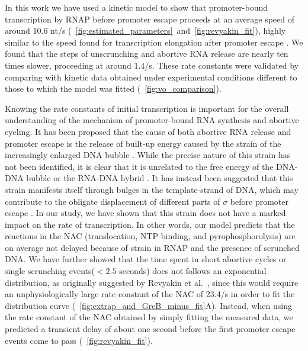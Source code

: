 %
In this work we have used a kinetic model to show that promoter-bound
transcription by RNAP before promoter escape proceeds at an average speed of
around 10.6 nt/s
(\FIGS~\ref{fig:estimated_parameters}~and~\ref{fig:revyakin_fit}), highly
similar to the speed found for transcription elongation after promoter escape
\cite{revyakin_abortive_2006}. We found that the steps of unscrunching and
abortive RNA release are nearly ten times slower, proceeding at around 1.4/s.
These rate constants were validated by comparing with kinetic data obtained
under experimental conditions different to those to which the model was fitted
(\FIG~\ref{fig:vo_comparison}).

Knowing the rate constants of initial transcription is important for the
overall understanding of the mechanism of promoter-bound RNA synthesis and
abortive cycling. It has been proposed that the cause of both abortive RNA
release and promoter escape is the release of built-up energy caused by the
strain of the increasingly enlarged DNA bubble \cite{straney_stressed_1987,
hsu_promoter_2002, revyakin_abortive_2006}. While the precise nature of this
strain has not been identified, it is clear that it is unrelated to the free
energy of the DNA-DNA bubble or the RNA-DNA hybrid \cite{hsu_initial_2006,
skancke_sequence-dependent_2015}. It has instead been suggested that this
strain manifests itself through bulges in the template-strand of DNA, which
may contribute to the obligate displacement of different parts of $\sigma$
before promoter escape \cite{winkelman_crosslink_2015}. In our study, we have
shown that this strain does not have a marked impact on the rate of
transcription. In other words, our model predicts that the reactions in the
NAC (translocation, NTP binding, and pyrophosphorolysis) are on average not
delayed because of strain in RNAP and the presence of scrunched DNA. We have
further showed that the time spent in short abortive cycles or single
scrunching events($< 2.5$ seconds) does not follows an exponential
distribution, as originally suggested by Revyakin et al.\
\cite{revyakin_abortive_2006}, since this would require an unphysiologically
large rate constant of the NAC of 23.4/s in order to fit the
distribution curve (\FIG~\ref{fig:extrap_and_GreB_minus_fit}A). Instead, when
using the rate constant of the NAC obtained by simply fitting the measured
data, we predicted a transient delay of about one second before the first
promoter escape events come to pass (\FIG~\ref{fig:revyakin_fit}).

